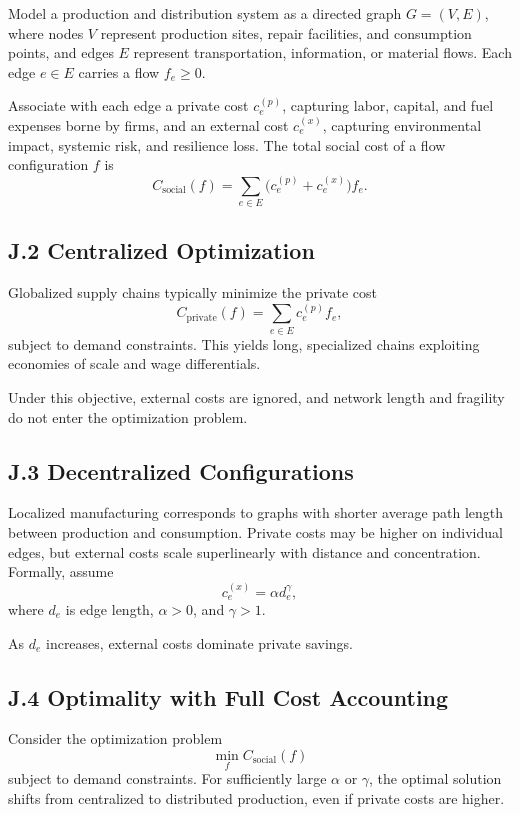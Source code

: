 \documentclass[11pt]{article}
\begin{document}
Model a production and distribution system as a directed graph \(G = (V,E)\), where nodes \(V\) represent production sites, repair facilities, and consumption points, and edges \(E\) represent transportation, information, or material flows. Each edge \(e \in E\) carries a flow \(f_e \ge 0\).

Associate with each edge a private cost \(c_e^{(p)}\), capturing labor, capital, and fuel expenses borne by firms, and an external cost \(c_e^{(x)}\), capturing environmental impact, systemic risk, and resilience loss. The total social cost of a flow configuration \(f\) is
\[
C_{\text{social}}(f) = \sum_{e \in E} \big(c_e^{(p)} + c_e^{(x)}\big) f_e.
\]

\subsection{J.2 Centralized Optimization}

Globalized supply chains typically minimize the private cost
\[
C_{\text{private}}(f) = \sum_{e \in E} c_e^{(p)} f_e,
\]
subject to demand constraints. This yields long, specialized chains exploiting economies of scale and wage differentials.

Under this objective, external costs are ignored, and network length and fragility do not enter the optimization problem.

\subsection{J.3 Decentralized Configurations}

Localized manufacturing corresponds to graphs with shorter average path length between production and consumption. Private costs may be higher on individual edges, but external costs scale superlinearly with distance and concentration. Formally, assume
\[
c_e^{(x)} = \alpha d_e^\gamma,
\]
where \(d_e\) is edge length, \(\alpha > 0\), and \(\gamma > 1\).

As \(d_e\) increases, external costs dominate private savings.

\subsection{J.4 Optimality with Full Cost Accounting}

Consider the optimization problem
\[
\min_f C_{\text{social}}(f)
\]
subject to demand constraints. For sufficiently large \(\alpha\) or \(\gamma\), the optimal solution shifts from centralized to distributed production, even if private costs are higher.
\end{document}
